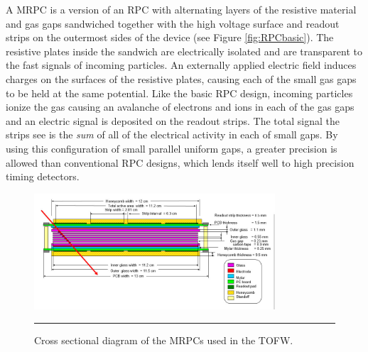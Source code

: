 A MRPC is a version of an RPC with alternating layers of the resistive material and gas gaps sandwiched together with the high voltage surface and readout strips on the outermost sides of the device \citep{Akindinov:2000rq} (see Figure \ref{fig:RPCbasic}). The resistive plates inside the sandwich are electrically isolated and are transparent to the fast signals of incoming particles. An externally applied electric field induces charges on the surfaces of the resistive plates, causing each of the small gas gaps to be held at the same potential. Like the basic RPC design, incoming particles ionize the gas causing an avalanche of electrons and ions in each of the gas gaps and an electric signal is deposited on the readout strips. The total signal the strips see is the \textit{sum} of all of the electrical activity in each of small gaps. By using this configuration of small parallel uniform gaps, a greater precision is allowed than conventional RPC designs, which lends itself well to high precision timing detectors.

\begin{figure}[ht!]
  \centering
    \includegraphics[width=0.8\textwidth]{Figures/MRPC_TOFW.jpg}
    \rule{35em}{0.5pt}
  \caption[Cross sectional diagram of the MRPCs used in the TOFW.]{Cross sectional diagram of the MRPCs used in the TOFW.}
  \label{fig:MRPCTOFW}
\end{figure}

